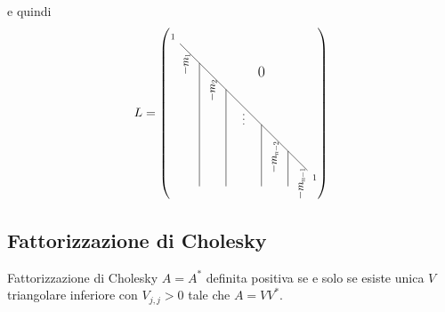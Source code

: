 \documentclass[a4paper]{article}
\begin{document}
e quindi
\[
    L = \left(
        \begin{tikzpicture}[
                baseline=(current bounding box.center),
                scale=0.5,
                transform shape,
                every node/.style={inner sep=1pt}
            ]
            \node at (0, 0) {\Large $1$};
            \node at (8, -8) {\Large $1$};

            \draw (0.4, -0.4) -- (7.6, -7.6);
            \node at (5, -2) {\Huge $0$};

            \foreach \x in {1.5, 3.0, 5.0, 6.5} {
                \draw (\x, -\x) -- (\x, -8.5);
            }

            \node[rotate=90, anchor=east] at (0.75, -0.9) {\LARGE \(-m_1\)};
            \node[rotate=90, anchor=east] at (2.25, -2.4) {\LARGE \(-m_2\)};
            \node[rotate=90, anchor=east] at (4.0, -4.2) {\LARGE $\dots$};
            \node[rotate=90, anchor=east] at (5.75, -5.9) {\LARGE \(-m_{n-2}\)};
            \node[rotate=90, anchor=east] at (7.25, -7.4) {\LARGE \(-m_{n-1}\)};
        \end{tikzpicture}
    \right)
\]

\subsection{Fattorizzazione di Cholesky}

\begin{snippettheorem}{Fattorizzazione di Cholesky}
    \(A = A^\ast\) definita positiva se e solo se
    esiste unica \(V\) triangolare inferiore con \(V_{j,j} > 0\) tale che \(A = VV^\ast\).
\end{snippettheorem}
\end{document}
